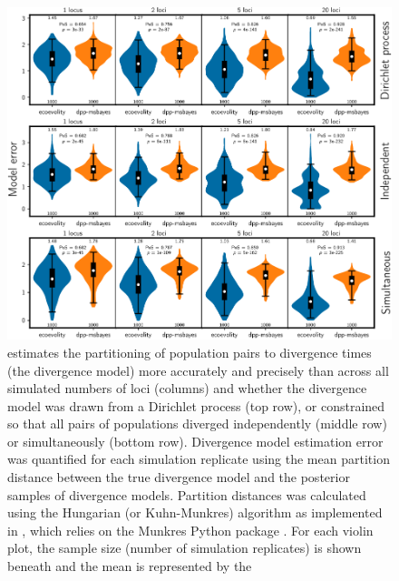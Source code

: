 \documentclass[letterpaper,12pt]{article}
\begin{document}
\begin{figure}[htbp]
    \begin{center}
        \includegraphics[width=\textwidth,height=\textheight,keepaspectratio]{../images/from-project-repo/plots/tex-plot-grids/grid-model-distance-cropped.pdf}
        \caption{
            \Ecoevolity estimates the partitioning of population pairs to
            divergence times (the divergence model) more accurately and
            precisely than \dppmsbayes across all simulated numbers of loci
            (columns) and whether the divergence model was drawn from a
            Dirichlet process (top row), or constrained so that all pairs of
            populations diverged independently (middle row) or simultaneously
            (bottom row).
            Divergence model estimation error was quantified for each
            simulation replicate using the mean partition distance
            \citep{Regnier1983,Gusfield2002} between the true divergence model
            and the posterior samples of divergence models.
            Partition distances was calculated using the Hungarian (or
            Kuhn-Munkres) algorithm
            \citep{Kuhn1955,Munkres1957}
            as implemented in \pycoevolity
            \citep[Version 0.2.11 Commit 85ea44b;][]{Oaks2018ecoevolity,PycoevolityRepoOnline},
            which relies on the Munkres Python package
            \citep[Version 1.1.4;][]{Clapper2020}.
            For each violin plot, the sample size (number of simulation
            replicates) is shown beneath and the mean is represented by the
}
\end{center}
\end{figure}
\end{document}
